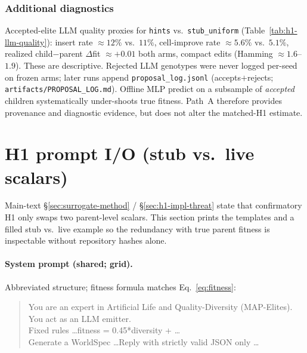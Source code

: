 \subsubsection*{Additional diagnostics}
Accepted-elite LLM quality proxies for \texttt{hints} vs.\ \texttt{stub\_uniform} (Table~\ref{tab:h1-llm-quality}): insert rate ${\approx}12\%$ vs.\ $11\%$, cell-improve rate ${\approx}5.6\%$ vs.\ $5.1\%$, realized child$-$parent $\Delta$fit ${\approx}{+}0.01$ both arms, compact edits (Hamming ${\approx}1.6$--$1.9$). These are descriptive. Rejected LLM genotypes were never logged per-seed on frozen arms; later runs append \texttt{proposal\_log.jsonl} (accepts$+$rejects; \texttt{artifacts/PROPOSAL\_LOG.md}). Offline MLP predict on a subsample of \emph{accepted} children systematically under-shoots true fitness. Path~A therefore provides provenance and diagnostic evidence, but does not alter the matched-H1 estimate.

\section{H1 prompt I/O (stub vs.\ live scalars)}
\label{sec:h1-prompt-appendix}

Main-text \S\ref{sec:surrogate-method} / \S\ref{sec:h1-impl-threat} state that confirmatory H1 only swaps two parent-level scalars. This section prints the templates and a filled stub vs.\ live example so the redundancy with true parent fitness is inspectable without repository hashes alone.

\paragraph{System prompt (shared; grid).}
Abbreviated structure; fitness formula matches Eq.~\eqref{eq:fitness}:
\begin{quote}
\small\ttfamily
You are an expert in Artificial Life and Quality-Diversity (MAP-Elites).\\
You act as an LLM emitter.\\
Fixed rules \ldots fitness = 0.45*diversity + \ldots\\
Generate a WorldSpec \ldots Reply with strictly valid JSON only \ldots
\end{quote}

